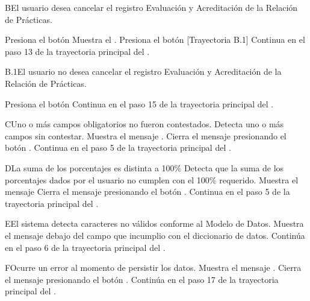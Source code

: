 \begin{UCtrayectoriaA}{B}{El usuario desea cancelar el registro Evaluación y Acreditación de la Relación de Prácticas.}

\UCpaso[\UCactor] Presiona el botón 
\UCpaso Muestra el .
\UCpaso[\UCactor] Presiona el botón  [Trayectoria B.1]
\UCpaso Continua en el paso 13 de la trayectoria principal del .

\end{UCtrayectoriaA}

\begin{UCtrayectoriaA}{B.1}{El usuario no desea cancelar el registro Evaluación y Acreditación de la Relación de Prácticas.}

\UCpaso[\UCactor] Presiona el botón 
\UCpaso Continua en el paso 15 de la trayectoria principal del .

\end{UCtrayectoriaA}

\begin{UCtrayectoriaA}{C}{Uno o más campos obligatorios no fueron contestados.}
\UCpaso Detecta uno o más campos sin contestar.
\UCpaso Muestra el mensaje .
\UCpaso[\UCactor] Cierra el mensaje presionando el botón .
\UCpaso Continua en el paso 5 de la trayectoria principal del .
\end{UCtrayectoriaA}

\begin{UCtrayectoriaA}{D}{La suma de los porcentajes es distinta a 100\%}
\UCpaso Detecta que la suma de los porcentajes dados por el usuario no cumplen con el 100\% requerido.
\UCpaso Muestra el mensaje 
\UCpaso[\UCactor] Cierra el mensaje presionando el botón .
\UCpaso Continua en el paso 5 de la trayectoria principal del .
\end{UCtrayectoriaA}



\begin{UCtrayectoriaA}{E}{El sistema detecta caracteres no válidos conforme al Modelo de Datos.}
\UCpaso Muestra el mensaje  debajo del campo que incumplio con el diccionario de datos.
\UCpaso Continúa en el paso 6 de la trayectoria principal del .
\end{UCtrayectoriaA}
    
\begin{UCtrayectoriaA}{F}{Ocurre un error al momento de persistir los datos.}
\UCpaso Muestra el mensaje .
\UCpaso[\UCactor] Cierra el mensaje presionando el botón .
\UCpaso Continúa en el paso 17 de la trayectoria principal del .
\end{UCtrayectoriaA}
